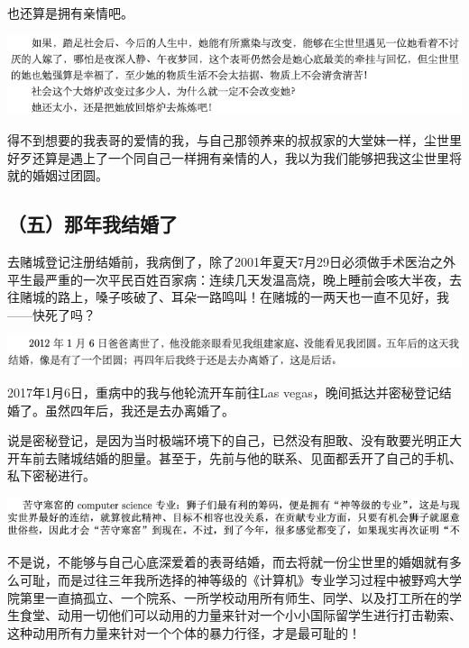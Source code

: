 \documentclass[9pt, b5paper]{article}
\begin{document}
也还算是拥有亲情吧。

\begin{center}
\includegraphics[width=.9\linewidth]{./pic/backups_plans_20210423_213157.png}
\end{center}

得不到想要的我表哥的爱情的我，与自己那领养来的叔叔家的大堂妹一样，尘世里好歹还算是遇上了一个同自己一样拥有亲情的人，我以为我们能够把我这尘世里将就的婚姻过团圆。

\subsection{（五）那年我结婚了}
\label{sec:orgda262d9}

去赌城登记注册结婚前，我病倒了，除了2001年夏天7月29日必须做手术医治之外平生最严重的一次平民百姓百家病：连续几天发温高烧，晚上睡前会咳大半夜，去往赌城的路上，嗓子咳破了、耳朵一路鸣叫！在赌城的一两天也一直不见好，我——快死了吗？

\begin{center}
\includegraphics[width=.9\linewidth]{./pic/backups_plans_20210423_213744.png}
\end{center}

2017年1月6日，重病中的我与他轮流开车前往Las vegas，晚间抵达并密秘登记结婚了。虽然四年后，我还是去办离婚了。

说是密秘登记，是因为当时极端环境下的自己，已然没有胆敢、没有敢要光明正大开车前去赌城结婚的胆量。甚至于，先前与他的联系、见面都丢开了自己的手机、私下密秘进行。

\begin{center}
\includegraphics[width=.9\linewidth]{./pic/backups_plans_20210427_120126.png}
\end{center}

不是说，不能够与自己心底深爱着的表哥结婚，而去将就一份尘世里的婚姻就有多么可耻，而是过往三年我所选择的神等级的《计算机》专业学习过程中被野鸡大学院第里一直搞孤立、一个院系、一所学校动用所有师生、同学、以及打工所在的学生食堂、动用一切他们可以动用的力量来针对一个小小国际留学生进行打击勒索、这种动用所有力量来针对一个个体的暴力行径，才是最可耻的！
\end{document}
